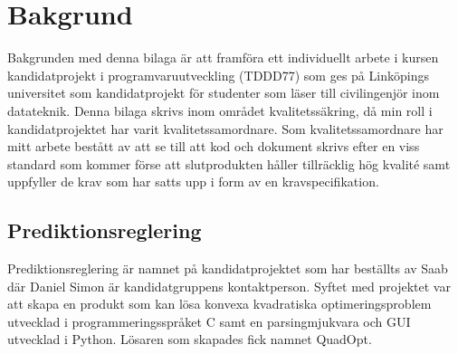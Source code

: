\section{Bakgrund}
Bakgrunden med denna bilaga är att framföra ett individuellt arbete i kursen kandidatprojekt i programvaruutveckling (TDDD77) som ges på Linköpings universitet som kandidatprojekt för studenter som läser till civilingenjör inom datateknik. 
\newline
\newline
Denna bilaga skrivs inom området kvalitetssäkring, då min roll i kandidatprojektet har varit kvalitetssamordnare. Som kvalitetssamordnare har mitt arbete bestått av att se till att kod och dokument skrivs efter en viss standard som kommer förse att slutprodukten håller tillräcklig hög kvalité samt uppfyller de krav som har satts upp i form av en kravspecifikation.

\subsection{Prediktionsreglering}
Prediktionsreglering är namnet på kandidatprojektet som har beställts av Saab där Daniel Simon är kandidatgruppens kontaktperson. Syftet med projektet var att skapa en produkt som kan lösa konvexa kvadratiska optimeringsproblem utvecklad i programmeringsspråket C samt en parsingmjukvara och GUI utvecklad i Python. Lösaren som skapades fick namnet QuadOpt.
